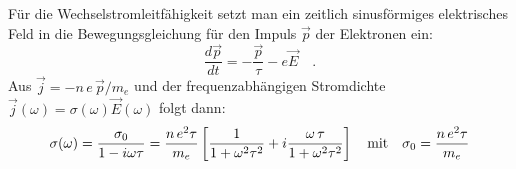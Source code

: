 \documentclass[pointlessnumbers,headsepline,twoside,11pt,DIV14,BCOR15mm,halfparskip,a4paper,appendixprefix]{scrreprt}
\begin{document}
Für die Wechselstromleitfähigkeit setzt man ein zeitlich sinusförmiges elektrisches Feld in die Bewegungsgleichung für den Impuls $\vec p$ der Elektronen ein:
	\begin{equation}
		\frac{d\vec p}{dt}=-\frac{\vec p}{\tau}-e\vec E\quad.
	\end{equation}
Aus $\vec j=-n\,e\,\vec p/m_e$ und der frequenzabhängigen Stromdichte $\vec j(\omega)=\sigma(\omega)\vec E(\omega)$ folgt dann:
	\begin{equation}
		\sigma(\omega)=\frac{\sigma_0}{1-i\omega\tau}=
			\frac{n\,e^2\tau}{m_e}\left[\frac1{1+\omega^2\tau^2}+
				i\frac{\omega\,\tau}{1+\omega^2\tau^2}\right]
		\quad\text{mit}\quad\sigma_0=\frac{n\,e^2\tau}{m_e}
	\end{equation}
\end{document}
